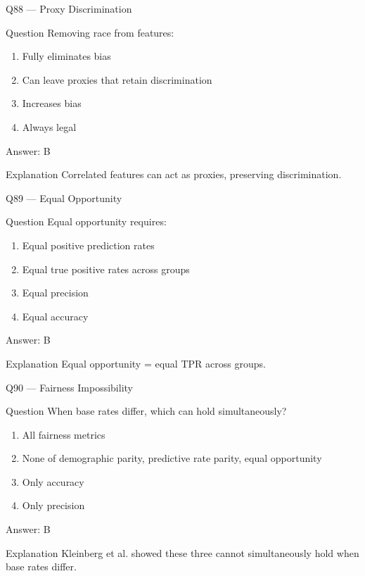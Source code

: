 \documentclass[aspectratio=169,8pt]{beamer}
\begin{document}
	\begin{frame}{Q88 --- Proxy Discrimination}
		\begin{block}{Question}
			Removing race from features:
		\end{block}
		\begin{enumerate}
			\item Fully eliminates bias
			\item Can leave proxies that retain discrimination
			\item Increases bias
			\item Always legal
		\end{enumerate}
		\begin{exampleblock}{Answer: B}\end{exampleblock}
		\begin{block}{Explanation}
			Correlated features can act as proxies, preserving discrimination.
		\end{block}
	\end{frame}
	
	\begin{frame}{Q89 --- Equal Opportunity}
		\begin{block}{Question}
			Equal opportunity requires:
		\end{block}
		\begin{enumerate}
			\item Equal positive prediction rates
			\item Equal true positive rates across groups
			\item Equal precision
			\item Equal accuracy
		\end{enumerate}
		\begin{exampleblock}{Answer: B}\end{exampleblock}
		\begin{block}{Explanation}
			Equal opportunity = equal TPR across groups.
		\end{block}
	\end{frame}
	
	\begin{frame}{Q90 --- Fairness Impossibility}
		\begin{block}{Question}
			When base rates differ, which can hold simultaneously?
		\end{block}
		\begin{enumerate}
			\item All fairness metrics
			\item None of demographic parity, predictive rate parity, equal opportunity
			\item Only accuracy
			\item Only precision
		\end{enumerate}
		\begin{exampleblock}{Answer: B}\end{exampleblock}
		\begin{block}{Explanation}
			Kleinberg et al. showed these three cannot simultaneously hold when base rates differ.
		\end{block}
	\end{frame}
	
\end{document}
